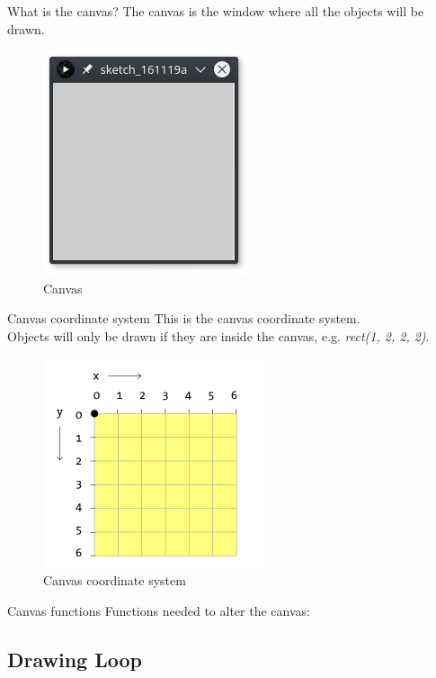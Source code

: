 \documentclass{beamer}
\begin{document}
\begin{frame}{What is the canvas?}
The canvas is the window where all the objects will be drawn.

\begin{figure}[H]
\centerline{\includegraphics[scale=0.5]{canvas.png}}
\caption{Canvas}
\end{figure}
\end{frame}

\begin{frame}{Canvas coordinate system}
This is the canvas coordinate system.\\
Objects will only be drawn if they are inside the canvas,
 e.g. \textit{rect(1, 2, 2, 2)}.

\begin{figure}[H]
\centerline{\includegraphics[scale=0.5]{canvas_coordinate_system.png}}
\caption{Canvas coordinate system}
\end{figure}
\end{frame}

\begin{frame}{Canvas functions}
Functions needed to alter the canvas:

\lstCanvasFunctions
\end{frame}

\subsection{Drawing Loop}
\end{document}
